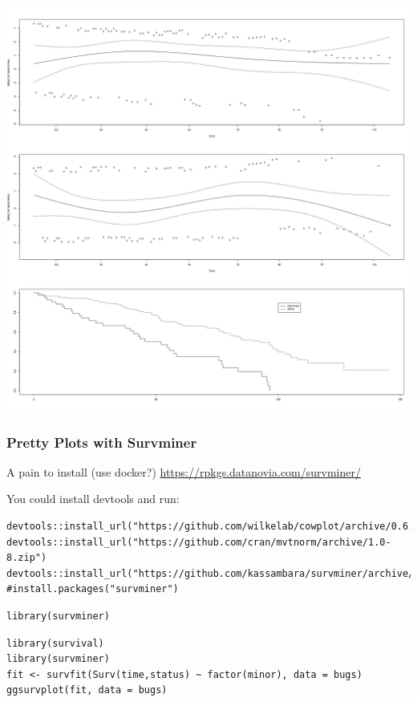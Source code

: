 \documentclass[11pt]{article}
\begin{document}
\begin{center}
\includegraphics[width=.9\linewidth]{RandBugsCox.png}
\end{center}
\subsubsection{Pretty Plots with Survminer}
\label{sec:org2d670db}

A pain to install (use docker?) \url{https://rpkgs.datanovia.com/survminer/}

You could install devtools and run:

\begin{verbatim}
devtools::install_url("https://github.com/wilkelab/cowplot/archive/0.6.3.zip")
devtools::install_url("https://github.com/cran/mvtnorm/archive/1.0-8.zip")
devtools::install_url("https://github.com/kassambara/survminer/archive/v0.4.3.zip")
#install.packages("survminer")
\end{verbatim}

\begin{verbatim}
library(survminer)
\end{verbatim}

\begin{verbatim}
library(survival)
library(survminer)
fit <- survfit(Surv(time,status) ~ factor(minor), data = bugs)
ggsurvplot(fit, data = bugs)
\end{verbatim}
\end{document}
